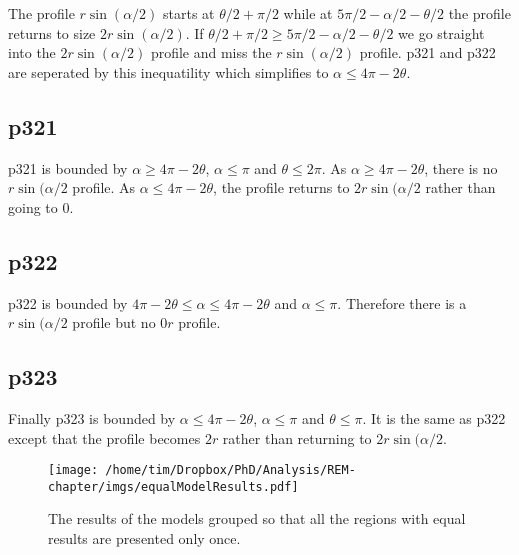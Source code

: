 The profile $r\sin(\alpha/2)$ starts at $\theta/2 + \pi/2$ while at $5\pi/2 - \alpha/2 - \theta/2$ the profile returns to size $2r\sin(\alpha/2)$. If $\theta/2 + \pi/2 \ge 5\pi/2 - \alpha/2 - \theta/2$ we go straight into the  $2r\sin(\alpha/2)$ profile and miss the $r\sin(\alpha/2)$ profile.  p321 and p322 are seperated by this inequatility which simplifies to $\alpha \le 4\pi - 2\theta$. 

\subsection{p321} \label{p321}

p321 is bounded by $\alpha \ge 4\pi - 2\theta$, $\alpha \le \pi$ and $\theta \le 2\pi$. As $\alpha \ge 4\pi - 2\theta$, there is no $r\sin(\alpha/2$ profile. As $\alpha \le 4\pi - 2\theta$, the profile returns to $2r\sin(\alpha/2$ rather than going to 0.



\subsection{p322} \label{p322}

p322 is bounded by $4\pi - 2\theta \le \alpha \le 4\pi - 2\theta$ and $\alpha \le \pi$. Therefore there is a $r\sin(\alpha/2$ profile but no $0r$ profile.



\subsection{p323} \label{p323}

Finally p323 is bounded by  $\alpha \le 4\pi - 2\theta $, $\alpha\le\pi$ and $\theta \le \pi$. It is the same as p322 except that the profile becomes $2r$ rather than returning to $2r\sin(\alpha/2$.




\begin{figure}[t]
\centering
\texttt{[image: /home/tim/Dropbox/PhD/Analysis/REM-chapter/imgs/equalModelResults.pdf]}
\caption[REM model solutions]{The results of the models grouped so that all the regions with equal results are presented only once.}
\label{f:equalModelResults}
\end{figure}

